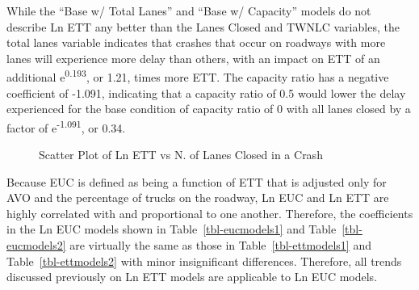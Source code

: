 \documentclass[
  letterpaper,
  authoryear]{elsarticle}
\begin{document}
While the ``Base w/ Total Lanes'' and ``Base w/ Capacity'' models do not
describe Ln ETT any better than the Lanes Closed and TWNLC variables,
the total lanes variable indicates that crashes that occur on roadways
with more lanes will experience more delay than others, with an impact
on ETT of an additional e\textsuperscript{0.193}, or 1.21, times more
ETT. The capacity ratio has a negative coefficient of -1.091, indicating
that a capacity ratio of 0.5 would lower the delay experienced for the
base condition of capacity ratio of 0 with all lanes closed by a factor
of e\textsuperscript{-1.091}, or 0.34.

\begin{figure}


\caption{\label{fig-LnETTvsLanesClosed}Scatter Plot of Ln ETT vs N. of
Lanes Closed in a Crash}

\end{figure}%

Because EUC is defined as being a function of ETT that is adjusted only
for AVO and the percentage of trucks on the roadway, Ln EUC and Ln ETT
are highly correlated with and proportional to one another. Therefore,
the coefficients in the Ln EUC models shown in
Table~\ref{tbl-eucmodels1} and Table~\ref{tbl-eucmodels2} are virtually
the same as those in Table~\ref{tbl-ettmodels1} and
Table~\ref{tbl-ettmodels2} with minor insignificant differences.
Therefore, all trends discussed previously on Ln ETT models are
applicable to Ln EUC models.
\end{document}
